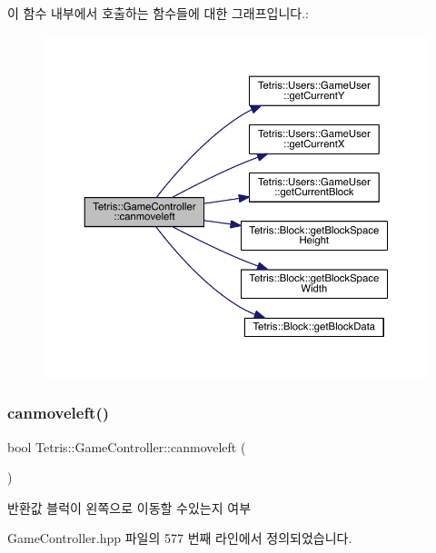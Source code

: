 이 함수 내부에서 호출하는 함수들에 대한 그래프입니다.\+:
\nopagebreak
\begin{figure}[H]
\begin{center}
\leavevmode
\includegraphics[width=350pt]{class_tetris_1_1_game_controller_ae541cf926ccdce47a185c94a0c80b642_cgraph}
\end{center}
\end{figure}
\mbox{\label{class_tetris_1_1_game_controller_ae541cf926ccdce47a185c94a0c80b642}} 
\subsubsection{\texorpdfstring{canmoveleft()}{canmoveleft()}\hspace{0.1cm}{\footnotesize\ttfamily [2/2]}}
{\footnotesize\ttfamily bool Tetris\+::\+Game\+Controller\+::canmoveleft (\begin{DoxyParamCaption}{ }\end{DoxyParamCaption})\hspace{0.3cm}{\ttfamily [inline]}}

\begin{DoxyReturn}{반환값}
블럭이 왼쪽으로 이동할 수있는지 여부 
\end{DoxyReturn}


Game\+Controller.\+hpp 파일의 577 번째 라인에서 정의되었습니다.

